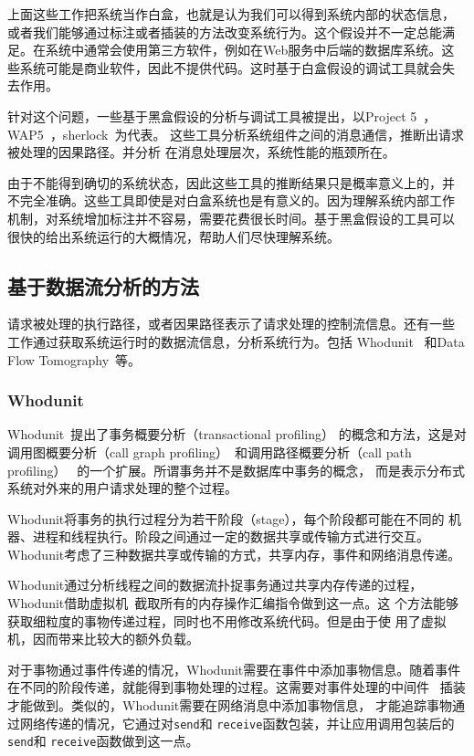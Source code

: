 上面这些工作把系统当作白盒，也就是认为我们可以得到系统内部的状态信息，
或者我们能够通过标注或者插装的方法改变系统行为。这个假设并不一定总能满
足。在系统中通常会使用第三方软件，例如在Web服务中后端的数据库系统。这
些系统可能是商业软件，因此不提供代码。这时基于白盒假设的调试工具就会失
去作用。

针对这个问题，一些基于黑盒假设的分析与调试工具被提出，以Project
5~\cite{project5}，WAP5~\cite{wap5}，sherlock~\cite{sherlock}为代表。
这些工具分析系统组件之间的消息通信，推断出请求被处理的因果路径。并分析
在消息处理层次，系统性能的瓶颈所在。

由于不能得到确切的系统状态，因此这些工具的推断结果只是概率意义上的，并
不完全准确。这些工具即使是对白盒系统也是有意义的。因为理解系统内部工作
机制，对系统增加标注并不容易，需要花费很长时间。基于黑盒假设的工具可以
很快的给出系统运行的大概情况，帮助人们尽快理解系统。

\subsection{基于数据流分析的方法}

请求被处理的执行路径，或者因果路径表示了请求处理的控制流信息。还有一些
工作通过获取系统运行时的数据流信息，分析系统行为。包括
Whodunit~\cite{whodunit} 和Data Flow Tomography~\cite{dft}等。

\subsubsection*{Whodunit}

Whodunit~\cite{whodunit}提出了事务概要分析（transactional profiling）
的概念和方法，这是对调用图概要分析（call graph
profiling）~\cite{Graham2004}和调用路径概要分析（call path profiling）~
\cite{Hall1992, Hall1993}的一个扩展。所谓事务并不是数据库中事务的概念，
而是表示分布式系统对外来的用户请求处理的整个过程。

Whodunit将事务的执行过程分为若干阶段（stage），每个阶段都可能在不同的
机器、进程和线程执行。阶段之间通过一定的数据共享或传输方式进行交互。
Whodunit考虑了三种数据共享或传输的方式，共享内存，事件和网络消息传递。

Whodunit通过分析线程之间的数据流扑捉事务通过共享内存传递的过程，
Whodunit借助虚拟机~\cite{qemu}截取所有的内存操作汇编指令做到这一点。这
个方法能够获取细粒度的事物传递过程，同时也不用修改系统代码。但是由于使
用了虚拟机，因而带来比较大的额外负载。

对于事物通过事件传递的情况，Whodunit需要在事件中添加事物信息。随着事件
在不同的阶段传递，就能得到事物处理的过程。这需要对事件处理的中间件
~\cite{seda}插装才能做到。类似的，Whodunit需要在网络消息中添加事物信息，
才能追踪事物通过网络传递的情况，它通过对\texttt{send}和
\texttt{receive}函数包装，并让应用调用包装后的\texttt{send}和
\texttt{receive}函数做到这一点。

